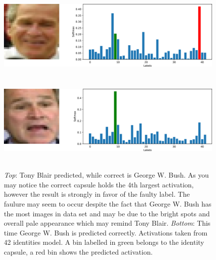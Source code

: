\begin{figure}[ht]
    \centering
    \includegraphics[height=12em]{obrazky-figures/predicted_131_fail.pdf}
    \vspace{1em}
    \includegraphics[height=12em]{obrazky-figures/predicted_116_ok.pdf}
    \caption{\textit{Top}: Tony Blair predicted, while correct is George W. Bush. As you may notice the correct capsule holds the 4th largest activation, however the result is strongly in favor of the faulty label. The faulure may seem to occur despite the fact that George W. Bush has the most images in data set and may be due to the bright spots and overall pale appearance which may remind Tony Blair. \textit{Bottom}: This time George W. Bush is predicted correctly. Activations taken from 42 identities model. A bin labelled in green belongs to the identity capsule, a red bin shows the predicted activation.}
    \label{fig:bush}
\end{figure}

